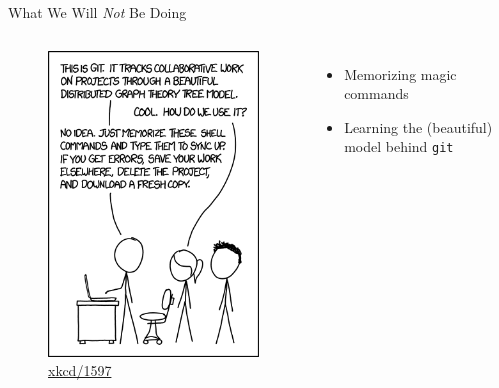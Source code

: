 \documentclass{beamer}
\theoremstyle{example}
\newcommand{\xkcd}[1]{\href{https://xkcd.com/#1}{xkcd/#1}}
\begin{document}
\begin{frame}{What We Will \emph{Not} Be Doing}
    \begin{columns}
        \begin{figure}
            \includegraphics[scale=0.4]{img/git}
            \caption{\xkcd{1597}}
        \end{figure}

        \begin{itemize}
            \item Memorizing magic commands
            \item Learning the (beautiful) model behind \texttt{git}
        \end{itemize}
    \end{columns}
\end{frame}
\end{document}

